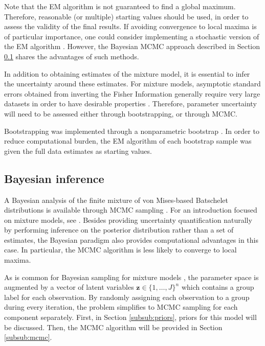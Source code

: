 Note that the EM algorithm is not guaranteed to find a global maximum. Therefore, reasonable (or multiple) starting values should be used, in order to assess the validity of the final results. If avoiding convergence to local maxima is of particular importance, one could consider implementing a stochastic version of the EM algorithm \citep{diebolt1996stochastic, nielsen2000stochastic}. However, the Bayesian MCMC approach described in Section \ref{sub:bayes} shares the advantages of such methods.

In addition to obtaining estimates of the mixture model, it is essential to infer the uncertainty around these estimates. For mixture models, asymptotic standard errors obtained from inverting the Fisher Information generally require very large datasets in order to have desirable properties \citep{mclachlan2004finite}. Therefore, parameter uncertainty will need to be assessed either through bootstrapping, or through MCMC.

Bootstrapping was implemented through a nonparametric bootstrap \citep{efron1994introduction}. In order to reduce computational burden, the EM algorithm of each bootstrap sample was given the full data estimates as starting values.

\subsection{Bayesian inference}
\label{sub:bayes}

A Bayesian analysis of the finite mixture of von Mises-based Batschelet distributions is available through MCMC sampling \citep{chib1995understanding, gilks1995markov}. For an introduction focused on mixture models, see \citet{fruhwirth2006finite}. Besides providing uncertainty quantification naturally by performing inference on the posterior distribution rather than a set of estimates, the Bayesian paradigm also provides computational advantages in this case. In particular, the MCMC algorithm is less likely to converge to local maxima.

As is common for Bayesian sampling for mixture models , the parameter space is augmented by a vector of latent variables \(\boldsymbol{z} \in \{1, \dots, J\}^n\) which contains a group label for each observation. By randomly assigning each observation to a group during every iteration, the problem simplifies to MCMC sampling for each component separately. First, in Section \ref{subsub:priors}, priors for this model will be discussed. Then, the MCMC algorithm will be provided in Section \ref{subsub:mcmc}.

